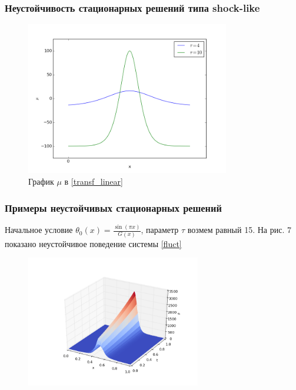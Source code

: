 \documentclass{beamer}
\begin{document}
\begin{frame}
\frametitle{Неустойчивость стационарных решений типа shock-like}

\begin{figure}[H]
    \centering
    \includegraphics[width=3.5in]{fig2}
    \caption{График $\mu$ в \eqref{transf_linear}}
\end{figure}

\end{frame}

\begin{frame}
\frametitle{Примеры неустойчивых стационарных решений}

Начальное условие $\theta_0(x) = \frac{\sin(\pi x)}{G(x)}$, параметр $\tau$ 
возмем равный 15. На рис. 7 показано неустойчивое поведение системы
\eqref{fluct}

\begin{figure}[H]
    \centering
    \includegraphics[width=3in]{ex_s15}
    \caption{}
\end{figure}

\end{frame}
\end{document}
